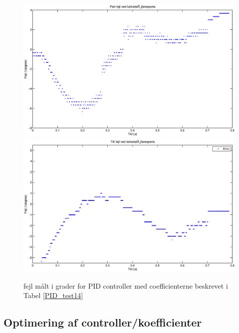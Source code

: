 \begin{figure}
\includegraphics[width=1\textwidth]{./graphics/error_pan.eps}
\includegraphics[width=1\textwidth]{./graphics/error_tilt.eps}
\caption{fejl målt i grader for PID controller med coefficienterne beskrevet i Tabel \ref{PID_test14} \label{PID_test14_plot} }
\end{figure}

\subsection{Optimering af controller/koefficienter}